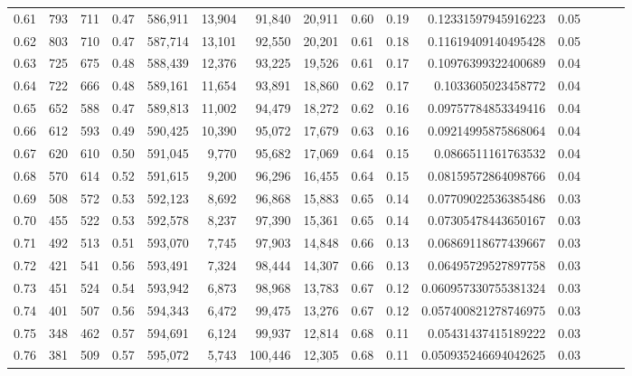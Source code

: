 \begin{tabular}{rrrrrrrrrrrrrrr}
0.61 &     793 &    711 &  0.47 &  586,911 &   13,904 &   91,840 &   20,911 &  0.60 &  0.19 &   0.12331597945916223 &      0.05 \\
0.62 &     803 &    710 &  0.47 &  587,714 &   13,101 &   92,550 &   20,201 &  0.61 &  0.18 &   0.11619409140495428 &      0.05 \\
0.63 &     725 &    675 &  0.48 &  588,439 &   12,376 &   93,225 &   19,526 &  0.61 &  0.17 &   0.10976399322400689 &      0.04 \\
0.64 &     722 &    666 &  0.48 &  589,161 &   11,654 &   93,891 &   18,860 &  0.62 &  0.17 &    0.1033605023458772 &      0.04 \\
0.65 &     652 &    588 &  0.47 &  589,813 &   11,002 &   94,479 &   18,272 &  0.62 &  0.16 &   0.09757784853349416 &      0.04 \\
0.66 &     612 &    593 &  0.49 &  590,425 &   10,390 &   95,072 &   17,679 &  0.63 &  0.16 &   0.09214995875868064 &      0.04 \\
0.67 &     620 &    610 &  0.50 &  591,045 &    9,770 &   95,682 &   17,069 &  0.64 &  0.15 &    0.0866511161763532 &      0.04 \\
0.68 &     570 &    614 &  0.52 &  591,615 &    9,200 &   96,296 &   16,455 &  0.64 &  0.15 &   0.08159572864098766 &      0.04 \\
0.69 &     508 &    572 &  0.53 &  592,123 &    8,692 &   96,868 &   15,883 &  0.65 &  0.14 &   0.07709022536385486 &      0.03 \\
0.70 &     455 &    522 &  0.53 &  592,578 &    8,237 &   97,390 &   15,361 &  0.65 &  0.14 &   0.07305478443650167 &      0.03 \\
0.71 &     492 &    513 &  0.51 &  593,070 &    7,745 &   97,903 &   14,848 &  0.66 &  0.13 &   0.06869118677439667 &      0.03 \\
0.72 &     421 &    541 &  0.56 &  593,491 &    7,324 &   98,444 &   14,307 &  0.66 &  0.13 &   0.06495729527897758 &      0.03 \\
0.73 &     451 &    524 &  0.54 &  593,942 &    6,873 &   98,968 &   13,783 &  0.67 &  0.12 &  0.060957330755381324 &      0.03 \\
0.74 &     401 &    507 &  0.56 &  594,343 &    6,472 &   99,475 &   13,276 &  0.67 &  0.12 &  0.057400821278746975 &      0.03 \\
0.75 &     348 &    462 &  0.57 &  594,691 &    6,124 &   99,937 &   12,814 &  0.68 &  0.11 &   0.05431437415189222 &      0.03 \\
0.76 &     381 &    509 &  0.57 &  595,072 &    5,743 &  100,446 &   12,305 &  0.68 &  0.11 &  0.050935246694042625 &      0.03 \\

\end{tabular}
